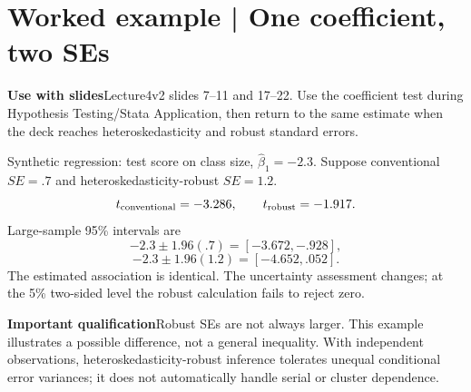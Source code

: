 \documentclass[11pt,a4paper]{article}
\newcommand{\heading}[1]{\section*{\color{accent}#1}}
\newcommand{\cue}[2]{\par\noindent\textbf{#1}\quad #2\par}
\begin{document}
\heading{Worked example | One coefficient, two SEs}
\cue{Use with slides}{Lecture4v2 slides 7--11 and 17--22. Use the coefficient test during Hypothesis Testing/Stata Application, then return to the same estimate when the deck reaches heteroskedasticity and robust standard errors.}
Synthetic regression: test score on class size, $\hat\beta_1=-2.3$. Suppose conventional $SE=.7$ and heteroskedasticity-robust $SE=1.2$.
\[
t_{\rm conventional}=-3.286,\qquad t_{\rm robust}=-1.917.
\]
Large-sample 95\% intervals are
\[
-2.3\pm1.96(.7)=[-3.672,-.928],
\]
\[
-2.3\pm1.96(1.2)=[-4.652,.052].
\]
The estimated association is identical. The uncertainty assessment changes; at the 5\% two-sided level the robust calculation fails to reject zero.
\cue{Important qualification}{Robust SEs are not always larger. This example illustrates a possible difference, not a general inequality. With independent observations, heteroskedasticity-robust inference tolerates unequal conditional error variances; it does not automatically handle serial or cluster dependence.}
\end{document}
